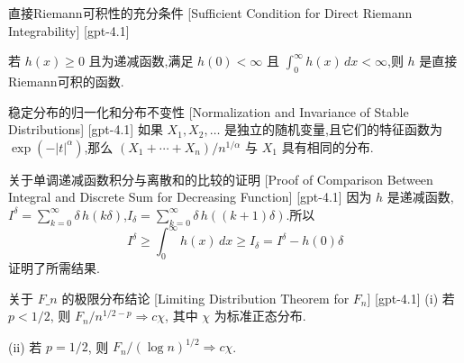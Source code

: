 \documentclass[UTF8]{ctexart}
\begin{document}
    
    
    \begin{lma}
        {直接Riemann可积性的充分条件}
        [Sufficient Condition for Direct Riemann Integrability]
        [gpt-4.1]
        
若 $h(x)\geq 0$ 且为递减函数,满足 $h(0)<\infty$ 且 $\int_{0}^{\infty} h(x)\, dx < \infty$,则 $h$ 是直接Riemann可积的函数.

    \end{lma}
    
    
    
    \begin{thm}
        {稳定分布的归一化和分布不变性}
        [Normalization and Invariance of Stable Distributions]
        [gpt-4.1]
        如果 $X_{1}, X_{2}, \dots$ 是独立的随机变量,且它们的特征函数为 $\exp(-|t|^{\alpha})$,那么 $(X_{1} + \cdots + X_{n}) / n^{1/\alpha}$ 与 $X_{1}$ 具有相同的分布.
    \end{thm}
    
    
    
    \begin{prf}
        {关于单调递减函数积分与离散和的比较的证明}
        [Proof of Comparison Between Integral and Discrete Sum for Decreasing Function]
        [gpt-4.1]
        因为 $h$ 是递减函数,$I^{\delta} = \sum_{k=0}^{\infty} \delta\, h(k\delta)$,$I_{\delta} = \sum_{k=0}^{\infty} \delta\, h((k+1)\delta)$.所以
\[
I^{\delta} \geq \int_{0}^{\infty} h(x)\, dx \geq I_{\delta} = I^{\delta} - h(0)\delta
\]
证明了所需结果.

    \end{prf}
    
    
    
    \begin{thm}
        {关于 $F\_n$ 的极限分布结论}
        [Limiting Distribution Theorem for $F_n$]
        [gpt-4.1]
        (i) 若 $p < 1/2$, 则 $F_{n} / n^{1/2 - p} \Rightarrow c \chi$, 其中 $\chi$ 为标准正态分布.

(ii) 若 $p = 1/2$, 则 $F_{n} / (\log n)^{1/2} \Rightarrow c \chi$.
    \end{thm}
    
    
    
\end{document}
